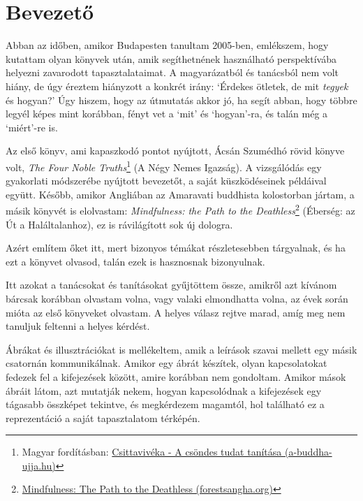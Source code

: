 \chapter{Bevezető}

\vspace{-\baselineskip}

Abban az időben, amikor Budapesten tanultam 2005-ben, emlékszem, hogy
kutattam olyan könyvek után, amik segíthetnének használható
perspektívába helyezni zavarodott tapasztalataimat. A magyarázatból és
tanácsból nem volt hiány, de úgy éreztem hiányzott a konkrét irány:
`Érdekes ötletek, de mit \emph{tegyek} és hogyan?' Úgy hiszem, hogy az
útmutatás akkor jó, ha segít abban, hogy többre legyél képes mint
korábban, fényt vet a `mit' és `hogyan'-ra, és talán még a `miért'-re
is.

Az első könyv, ami kapaszkodó pontot nyújtott, Ácsán Szumédhó rövid
könyve volt, \emph{The Four Noble Truths}\footnote{Magyar fordításban:
  \href{https://a-buddha-ujja.hu/books/csittaviveka/hu}{Csittavivéka - A
  csöndes tudat tanítása (a-buddha-ujja.hu)}} (A Négy Nemes Igazság). A
vizsgálódás egy gyakorlati módszerébe nyújtott bevezetőt, a saját
küszködéseinek példáival együtt. Később, amikor Angliában az Amaravati
buddhista kolostorban jártam, a másik könyvét is elolvastam:
\emph{Mindfulness: the Path to the Deathless}\footnote{\href{https://forestsangha.org/teachings/books/mindfulness-the-path-to-the-deathless?language=English}{Mindfulness:
  The Path to the Deathless (forestsangha.org)}} (Éberség: az Út a
Haláltalanhoz), ez is rávilágított sok új dologra.

Azért említem őket itt, mert bizonyos témákat részletesebben tárgyalnak,
és ha ezt a könyvet olvasod, talán ezek is hasznosnak bizonyulnak.

\enlargethispage*{2\baselineskip}

Itt azokat a tanácsokat és tanításokat gyűjtöttem össze, amikről azt
kívánom bárcsak korábban olvastam volna, vagy valaki elmondhatta volna,
az évek során mióta az első könyveket olvastam. A helyes válasz rejtve
marad, amíg meg nem tanuljuk feltenni a helyes kérdést.

Ábrákat és illusztrációkat is mellékeltem, amik a leírások szavai
mellett egy másik csatornán kommunikálnak. Amikor egy ábrát készítek,
olyan kapcsolatokat fedezek fel a kifejezések között, amire korábban nem
gondoltam. Amikor mások ábráit látom, azt mutatják nekem, hogyan
kapcsolódnak a kifejezések egy tágasabb összképet tekintve, és
megkérdezem magamtól, hol található ez a reprezentáció a saját
tapasztalatom térképén.

